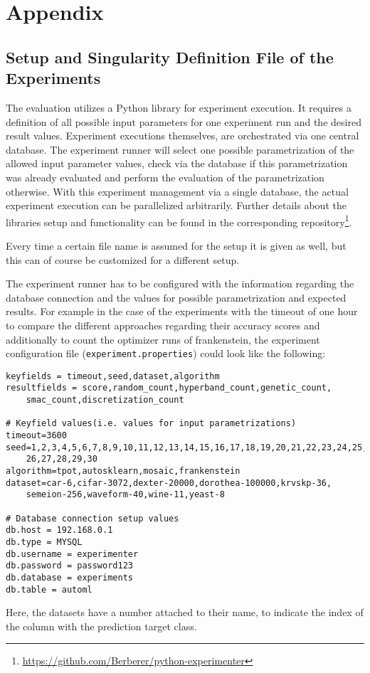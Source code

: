 %
\chapter{Appendix}
\label{sec:appendix}

\section{Setup and Singularity Definition File of the Experiments}
\label{sec:appendix:singularity}
The evaluation utilizes a Python library for experiment execution.
It requires a definition of all possible input parameters for one experiment run and the desired result values.\newline
Experiment executions themselves, are orchestrated via one central database.
The experiment runner will select one possible parametrization of the allowed input parameter values, check via the database if this parametrization was already evaluated and perform the evaluation of the parametrization otherwise.
With this experiment management via a single database, the actual experiment execution can be parallelized arbitrarily.
Further details about the libraries setup and functionality can be found in the corresponding repository\footnote{\url{https://github.com/Berberer/python-experimenter}}.\newline

Every time a certain file name is assumed for the setup it is given as well, but this can of course be customized for a different setup.

The experiment runner has to be configured with the information regarding the database connection and the values for possible parametrization and expected results.
For example in the case of the experiments with the timeout of one hour to compare the different approaches regarding their accuracy scores and additionally to count the optimizer runs of frankenstein, the experiment configuration file (\texttt{experiment.properties}) could look like the following:
\begin{Verbatim}[fontsize=\scriptsize]
keyfields = timeout,seed,dataset,algorithm
resultfields = score,random_count,hyperband_count,genetic_count,
    smac_count,discretization_count

# Keyfield values(i.e. values for input parametrizations)
timeout=3600
seed=1,2,3,4,5,6,7,8,9,10,11,12,13,14,15,16,17,18,19,20,21,22,23,24,25,
    26,27,28,29,30
algorithm=tpot,autosklearn,mosaic,frankenstein
dataset=car-6,cifar-3072,dexter-20000,dorothea-100000,krvskp-36,
    semeion-256,waveform-40,wine-11,yeast-8

# Database connection setup values
db.host = 192.168.0.1
db.type = MYSQL
db.username = experimenter
db.password = password123
db.database = experiments
db.table = automl
\end{Verbatim}
Here, the datasets have a number attached to their name, to indicate the index of the column with the prediction target class.

